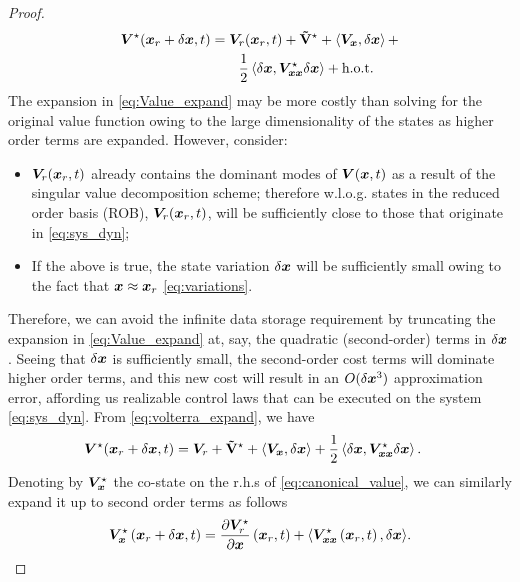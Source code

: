 \begin{proof}
	\begin{align}
		\valuefunc^\star(\state_r + \delta \state, t) &= \valuefunc_r(\state_r, t) + \costdiff^\star + \left\langle\valuefunc_{\state}, \delta \state \right\rangle + \nonumber \\
		& \qquad \dfrac{1}{2} \left\langle \delta \state, \valuefunc^\star_{\state\state} \delta\state \right\rangle + \text{h.o.t}.
		\label{eq:Value_expand}
	\end{align}
	The expansion in \eqref{eq:Value_expand} may be more costly than solving for the original value function owing to the large dimensionality of the states as higher order terms are expanded. However, consider:
	\begin{itemize}
		\item $\bm{V}_r(\bm{x}_r, t)$ already contains the dominant modes of $\bm{V}(\bm{x}, t)$ as a result of the singular value decomposition scheme; therefore w.l.o.g. states in the reduced order basis (ROB), $\bm{V}_r(\bm{x}_r, t)$, will be sufficiently close to those that originate in \eqref{eq:sys_dyn};
		\item If the above is true, the state variation  $\delta \bm{x}$ will be sufficiently small owing to the fact that $\bm{x} \approx \bm{x}_r$  \cf \eqref{eq:variations}.
	\end{itemize}
	Therefore, we can avoid the infinite data storage requirement by truncating the expansion in \eqref{eq:Value_expand} at, say, the quadratic (second-order) terms in $\delta \bm{x}$. Seeing that $\delta \bm{x}$ is sufficiently small, the second-order cost terms will dominate higher order terms, and this new cost will result in an $O(\delta \bm{x}^3)$ approximation error, affording us realizable control laws that can be executed on the system \eqref{eq:sys_dyn}. From \eqref{eq:volterra_expand}, we have
	\begin{align}
		\valuefunc^\star(\state_r + \delta \state, t) &= \valuefunc_r + \costdiff^\star + \left\langle\valuefunc_{\state}, \delta \state \right\rangle +  \dfrac{1}{2} \left\langle \delta \state, \valuefunc^\star_{\state\state} \delta\state \right\rangle.
		\label{eq:val_rom_expand}
	\end{align}
	Denoting by $\bm{V}_{\bm{x}}^\star$ the co-state on the r.h.s of \eqref{eq:canonical_value}, we  can similarly expand it up to second order terms as follows
	\begin{align}
		\valuefunc_{\state}^\star\left(\state_r + \delta \state, t \right) = \dfrac{\partial \valuefunc^\star_r}{\partial \state}\left(\state_r , t \right) + \langle \valuefunc^\star_{\state\state}\left(\state_r , t \right), \delta \state \rangle.

\end{align}
\end{proof}
